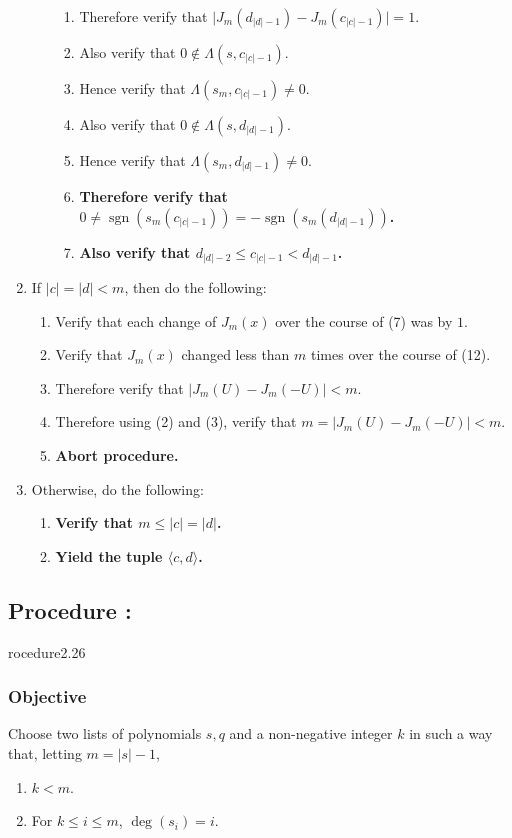 \documentclass{article}
\DeclareMathOperator{\sgn}{sgn}
\newcounter{procedure}[part]
\newcommand{\procedure}[1]{\subsection*{Procedure \thepart:\theprocedure}\label{sec:procedure #1}\global\expandafter\edef\csname procedure#1\endcsname{\thepart:\theprocedure}\addtocounter{procedure}{1}}
\newcommand{\objective}{\subsubsection*{Objective}}
\begin{document}
\begin{multicols}{2}
\begin{enumerate}
\begin{enumerate}
\begin{enumerate}
							\item Therefore verify that $\lvert J_m(d_{\lvert d\rvert-1})-J_m(c_{\lvert c\rvert-1})\rvert=1$.
							\item Also verify that $0\not\in\Lambda(s,c_{\lvert c\rvert-1})$.
							\item Hence verify that $\Lambda(s_m,c_{\lvert c\rvert-1})\ne 0$.
							\item Also verify that $0\not\in\Lambda(s,d_{\lvert d\rvert-1})$.
							\item Hence verify that $\Lambda(s_m,d_{\lvert d\rvert-1})\ne 0$.
							\item \textbf{Therefore verify that $0\ne\sgn(s_m(c_{\lvert c\rvert-1}))=-\sgn(s_m(d_{\lvert d\rvert-1}))$.}
							\item \textbf{Also verify that $d_{\lvert d\rvert-2}\le c_{\lvert c\rvert-1}<d_{\lvert d\rvert-1}$.}
						\end{enumerate}
					\end{enumerate}
					\item If $\lvert c\rvert=\lvert d\rvert<m$, then do the following:
					\begin{enumerate}
						\item Verify that each change of $J_m(x)$ over the course of (7) was by $1$.
						\item Verify that $J_m(x)$ changed less than $m$ times over the course of (12).
						\item Therefore verify that $\lvert J_m(U)-J_m(-U)\rvert<m$.
						\item Therefore using (2) and (3), verify that $m=\lvert J_m(U)-J_m(-U)\rvert<m$.
						\item \textbf{Abort procedure.}
					\end{enumerate}
					\item Otherwise, do the following:
					\begin{enumerate}
						\item \textbf{Verify that $m\le\lvert c\rvert=\lvert d\rvert$.}
						\item \textbf{Yield the tuple $\langle c,d\rangle$.}
					\end{enumerate}
				\end{enumerate}
		\procedure{2.26}
			\objective
				Choose two lists of polynomials $s,q$ and a non-negative integer $k$ in such a way that, letting $m=\lvert s\rvert-1$,
				\begin{enumerate}
					\item $k<m$.
					\item For $k\le i\le m$, $\deg(s_i)=i$.

\end{enumerate}
\end{multicols}
\end{document}
